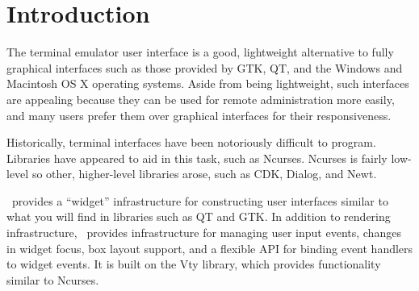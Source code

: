 \chapter{Introduction}

The terminal emulator user interface is a good, lightweight
alternative to fully graphical interfaces such as those provided by
GTK, QT, and the Windows and Macintosh OS X operating systems.  Aside
from being lightweight, such interfaces are appealing because they can
be used for remote administration more easily, and many users prefer
them over graphical interfaces for their responsiveness.

Historically, terminal interfaces have been notoriously difficult to
program.  Libraries have appeared to aid in this task, such as
Ncurses.  Ncurses is fairly low-level so other, higher-level libraries
arose, such as CDK, Dialog, and Newt.

\vtyui\ provides a “widget” infrastructure for constructing user
interfaces similar to what you will find in libraries such as QT and
GTK.  In addition to rendering infrastructure, \vtyui\ provides
infrastructure for managing user input events, changes in widget
focus, box layout support, and a flexible API for binding event
handlers to widget events.  It is built on the Vty library, which
provides functionality similar to Ncurses.




